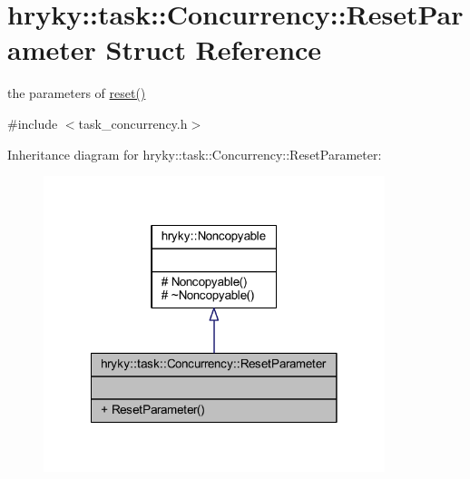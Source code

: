 \hypertarget{structhryky_1_1task_1_1_concurrency_1_1_reset_parameter}{\section{hryky\-:\-:task\-:\-:Concurrency\-:\-:Reset\-Parameter Struct Reference}
\label{structhryky_1_1task_1_1_concurrency_1_1_reset_parameter}
}


the parameters of \hyperlink{classhryky_1_1task_1_1_concurrency_aa81eeaa909ee4abde16a1619da5c011d}{reset()}  




{\ttfamily \#include $<$task\-\_\-concurrency.\-h$>$}



Inheritance diagram for hryky\-:\-:task\-:\-:Concurrency\-:\-:Reset\-Parameter\-:\nopagebreak
\begin{figure}[H]
\begin{center}
\leavevmode
\includegraphics[width=282pt]{structhryky_1_1task_1_1_concurrency_1_1_reset_parameter__inherit__graph}
\end{center}
\end{figure}
